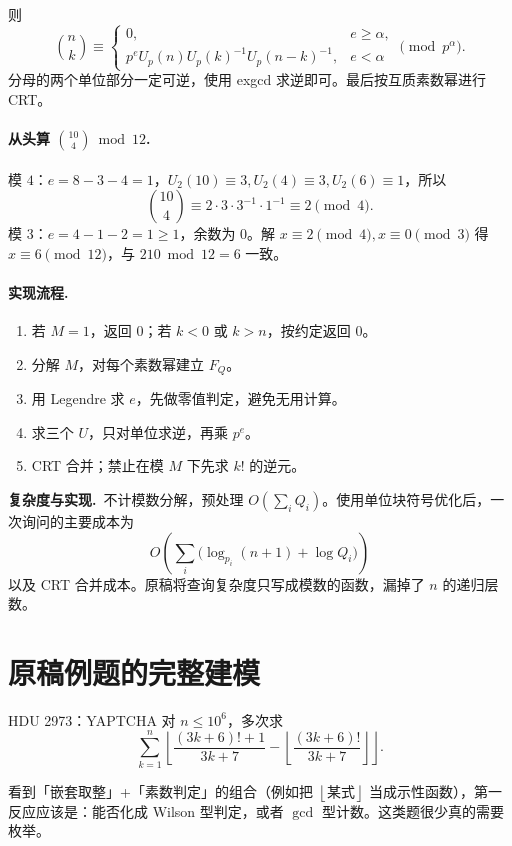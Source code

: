 \documentclass[UTF8,a4paper,11pt,oneside,openany,fontset=fandol]{ctexbook}
\theoremstyle{definition}
\newcommand{\floor}[1]{\left\lfloor #1\right\rfloor}
\newcommand{\cost}{\par\noindent\textbf{复杂度与实现.}\ }
\begin{document}
则
\[
\binom nk\equiv
\begin{cases}
0,&e\ge\alpha,\\
p^eU_p(n)U_p(k)^{-1}U_p(n-k)^{-1},&e<\alpha
\end{cases}\pmod{p^\alpha}.
\]
分母的两个单位部分一定可逆，使用 exgcd 求逆即可。最后按互质素数幂进行 CRT。


\paragraph{从头算 $\binom{10}{4}\bmod12$.}
模 $4$：$e=8-3-4=1$，$U_2(10)\equiv3,U_2(4)\equiv3,U_2(6)\equiv1$，所以
\[
 \binom{10}{4}\equiv2\cdot3\cdot3^{-1}\cdot1^{-1}\equiv2\pmod4.
\]
模 $3$：$e=4-1-2=1\ge1$，余数为 $0$。解 $x\equiv2\pmod4,x\equiv0\pmod3$ 得 $x\equiv6\pmod{12}$，与 $210\bmod12=6$ 一致。

\paragraph{实现流程.}
\begin{enumerate}
\item 若 $M=1$，返回 $0$；若 $k<0$ 或 $k>n$，按约定返回 $0$。
\item 分解 $M$，对每个素数幂建立 $F_Q$。
\item 用 Legendre 求 $e$，先做零值判定，避免无用计算。
\item 求三个 $U$，只对单位求逆，再乘 $p^e$。
\item CRT 合并；禁止在模 $M$ 下先求 $k!$ 的逆元。
\end{enumerate}
\cost 不计模数分解，预处理 $O(\sum_iQ_i)$。使用单位块符号优化后，一次询问的主要成本为
\[
O\!\left(\sum_i\bigl(\log_{p_i}(n+1)+\log Q_i\bigr)\right)
\]
以及 CRT 合并成本。原稿将查询复杂度只写成模数的函数，漏掉了 $n$ 的递归层数。


\section{原稿例题的完整建模}
\begin{problem}{HDU 2973：YAPTCHA}
对 $n\le10^6$，多次求
\[
\sum_{k=1}^n\floor{\frac{(3k+6)!+1}{3k+7}-\floor{\frac{(3k+6)!}{3k+7}}}.
\]
\end{problem}

\begin{tip}
看到「嵌套取整」+「素数判定」的组合（例如把 $\floor{\text{某式}}$ 当成示性函数），第一反应应该是：能否化成 Wilson 型判定，或者 $\gcd$ 型计数。这类题很少真的需要枚举。
\end{tip}
\end{document}
